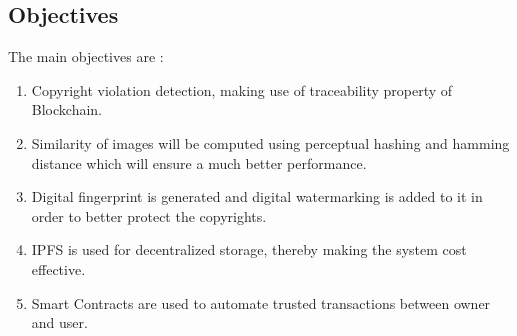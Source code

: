 \documentclass[10pt]{article}
\begin{document}
\subsection{Objectives}
The main objectives are : 
\begin{enumerate}
    \item Copyright violation detection, making use of traceability property of Blockchain.
    \item Similarity of images will be computed using perceptual hashing and hamming distance which will ensure a much better performance.
    \item Digital fingerprint is generated and digital watermarking is added to it in order to better protect the copyrights.
    \item IPFS is used for decentralized storage, thereby making the system cost effective.
    \item Smart Contracts are used to automate trusted transactions between owner and user.
\end{enumerate}
\end{document}
